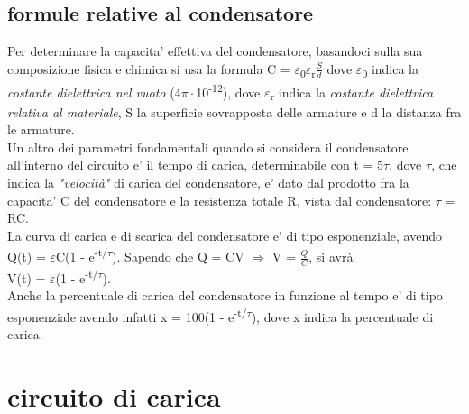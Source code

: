 \documentclass[12pt]{article}
\begin{document}
\subsection*{formule relative al condensatore}
Per determinare la capacita' effettiva del condensatore, basandoci sulla sua composizione fisica e chimica si usa la formula 
C = $\varepsilon$\textsubscript{0}$\varepsilon$\textsubscript{r}$\frac{S}{d}$
dove $\varepsilon$\textsubscript{0} indica la 
\textit{costante dielettrica nel vuoto} (4$\pi\cdot$10\textsuperscript{-12}),
dove $\varepsilon$\textsubscript{r} indica la \textit{costante dielettrica relativa al materiale},
S la superficie sovrapposta delle armature e d la distanza fra le armature. \\

Un altro dei parametri fondamentali quando si considera il condensatore all'interno
del circuito e' il tempo di carica, determinabile con t = 5$\tau$, dove $\tau$, 
che indica la \textit{"velocità"} di carica del condensatore, e' dato dal prodotto fra 
la capacita' C del condensatore e la resistenza totale R, vista dal condensatore: $\tau$ = RC. \\

La curva di carica e di scarica del condensatore e' di tipo esponenziale, avendo
Q(t) = $\varepsilon$C(1 - e\textsuperscript{-t/$\tau$}).
Sapendo che Q = CV $\Rightarrow$ V = $\frac{Q}{C}$, si avrà \\
V(t) = $\varepsilon$(1 - e\textsuperscript{-t/$\tau$}). \\

Anche la percentuale di carica del condensatore in funzione al tempo e' di tipo esponenziale
avendo infatti x = 100(1 - e\textsuperscript{-t/$\tau$}), dove x indica la percentuale di carica.

\newpage

\section*{circuito di carica}
\end{document}
